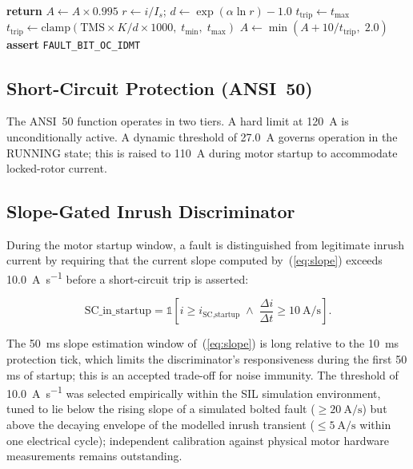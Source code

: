 \documentclass[conference]{IEEEtran}
\begin{document}
\begin{algorithm}[t]
  \caption{IDMT Discrete Accumulator}
  \label{alg:idmt}
  \begin{algorithmic}[1]
      \STATE \textbf{return} \quad {}
    \ENDIF
      \STATE $A \leftarrow A \times 0.995$
        \quad {}
    \ELSE
      \STATE $r \leftarrow i / I_s$; \quad $d \leftarrow \exp(\alpha \ln r) - 1.0$
        \STATE $t_{\text{trip}} \leftarrow t_{\text{max}}$
      \ELSE
        \STATE $t_{\text{trip}} \leftarrow
          \text{clamp}(\text{TMS} \times K / d \times 1000,\; t_{\min},\; t_{\max})$
      \ENDIF
      \STATE $A \leftarrow \min(A + 10 / t_{\text{trip}},\; 2.0)$
    \ENDIF
      \STATE \textbf{assert} \texttt{FAULT\_BIT\_OC\_IDMT}
    \ENDIF
  \end{algorithmic}
\end{algorithm}

\subsection{Short-Circuit Protection (ANSI~50)}

The ANSI~50 function operates in two tiers.  A hard limit at
\SI{120}{\ampere} is unconditionally active.  A dynamic threshold of
\SI{27.0}{\ampere} governs operation in the RUNNING state; this is
raised to \SI{110}{\ampere} during motor startup to accommodate
locked-rotor current.

\subsection{Slope-Gated Inrush Discriminator}
\label{subsec:disc}

During the motor startup window, a fault is distinguished from
legitimate inrush current by requiring that the current slope computed
by~(\ref{eq:slope}) exceeds \SI{10.0}{\ampere\per\second} before a
short-circuit trip is asserted:

\begin{equation}
  \text{SC\_in\_startup} = \mathbb{1}\!\left[i \geq i_{\text{SC,startup}}
  \;\wedge\; \frac{\Delta i}{\Delta t} \geq
  \SI{10}{\ampere\per\second}\right].
  \label{eq:sc_slope}
\end{equation}

The \SI{50}{\milli\second} slope estimation window of~(\ref{eq:slope})
is long relative to the \SI{10}{\milli\second} protection tick, which
limits the discriminator's responsiveness during the first 50\,ms of
startup; this is an accepted trade-off for noise immunity.  The
threshold of \SI{10.0}{\ampere\per\second} was selected
empirically within the SIL simulation environment, tuned to lie below
the rising slope of a simulated bolted fault
(${\geq}\SI{20}{\ampere\per\second}$) but above the decaying
envelope of the modelled inrush transient
(${\leq}\SI{5}{\ampere\per\second}$ within one electrical cycle);
independent calibration against physical motor hardware measurements
remains outstanding.
\end{document}
